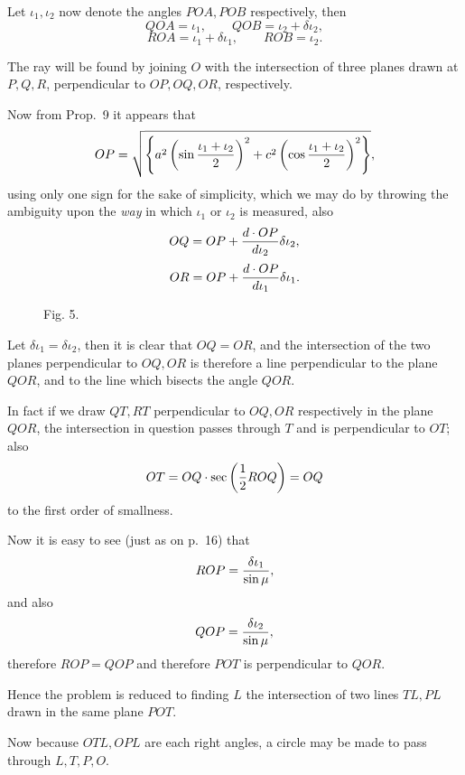 \documentclass[11pt]{article}
\newcommand{\sourcepage}[1]{\marginpar{\scriptsize p.~#1}}
\newcommand{\figcaption}[1]{\par\smallskip\centerline{\small #1}\smallskip}
\begin{document}
Let $\iota_1,\iota_2$ now denote the angles $POA,POB$ respectively, then
\[
 QOA=\iota_1,\qquad QOB=\iota_2+\delta\iota_2,
\]
\[
 ROA=\iota_1+\delta\iota_1,
\qquad ROB=\iota_2.
\]

The ray will be found by joining $O$ with the intersection of three planes drawn at $P,Q,R$, perpendicular to $OP,OQ,OR$, respectively.

Now from Prop.~9 it appears that
\[
 OP=\sqrt{\left\{a^2\left(\sin{\iota_1+\iota_2\over2}\right)^2
 +c^2\left(\cos{\iota_1+\iota_2\over2}\right)^2\right\}},
\]
using only one sign for the sake of simplicity, which we may do by throwing the ambiguity upon the \emph{way} in which $\iota_1$ or $\iota_2$ is measured, also
\[
 OQ=OP+{d\cdot OP\over d\iota_2}\delta\iota_2,
\]
\[
 OR=OP+{d\cdot OP\over d\iota_1}\delta\iota_1.
\]
\begin{figure}[h]
\centering
{}
\figcaption{Fig. 5.}
\end{figure}
Let $\delta\iota_1=\delta\iota_2$, then it is clear that $OQ=OR$, and the intersection of the two planes perpendicular to $OQ,OR$ is therefore a line perpendicular to the plane $QOR$, and to the line which bisects the angle $QOR$.

In fact if we draw $QT,RT$ perpendicular to $OQ,OR$ respectively in the plane $QOR$, the intersection in question passes through $T$ and is perpendicular to $OT$; also
\[
 OT=OQ\cdot \sec\left({1\over2}ROQ\right)=OQ
\]
to the first order of smallness.

\sourcepage{21}
Now it is easy to see (just as on p.~16) that
\[
 ROP={\delta\iota_1\over\sin\mu},
\]
and also
\[
 QOP={\delta\iota_2\over\sin\mu},
\]
therefore $ROP=QOP$ and therefore $POT$ is perpendicular to $QOR$.

Hence the problem is reduced to finding $L$ the intersection of two lines $TL,PL$ drawn in the same plane $POT$.

Now because $OTL,OPL$ are each right angles, a circle may be made to pass through $L,T,P,O$.
\end{document}
